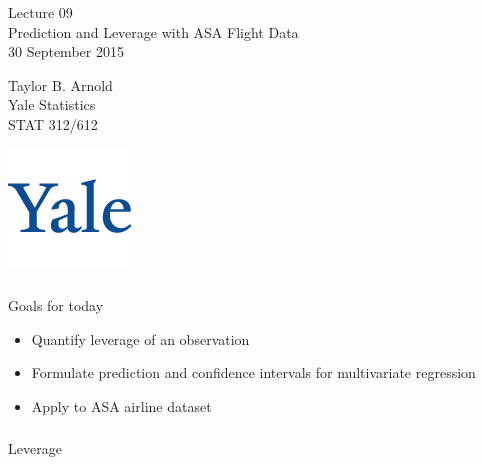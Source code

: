 



\begin{frame}[fragile] \frametitle{}

\vfill

{\fontsize{0.7cm}{0cm}\selectfont Lecture 09 \\\vspace{0.2cm}
Prediction and Leverage with ASA Flight Data}\\\vspace{0.5cm}
30 September 2015

\vspace{2cm}

\begin{minipage}{0.6\textwidth}
Taylor B. Arnold \\
Yale Statistics \\
STAT 312/612
\end{minipage}
\hfill
\begin{minipage}{0.3\textwidth}\raggedleft
\includegraphics[scale=0.3]{../yale-logo.png}
\end{minipage}%

\end{frame}


\begin{frame}[fragile] \frametitle{}

{\color{yaleblue}\fontsize{16pt}{20pt}\selectfont Goals for today}

\begin{itemize}
\item Quantify leverage of an observation
\item Formulate prediction and confidence intervals for multivariate regression
\item Apply to ASA airline dataset
\end{itemize}

\end{frame}

\begin{frame}[fragile] \frametitle{}

\begin{flushright}
{\color{yaleblue}\sc\fontsize{1cm}{0cm}\selectfont Leverage}
\end{flushright}

\end{frame}

